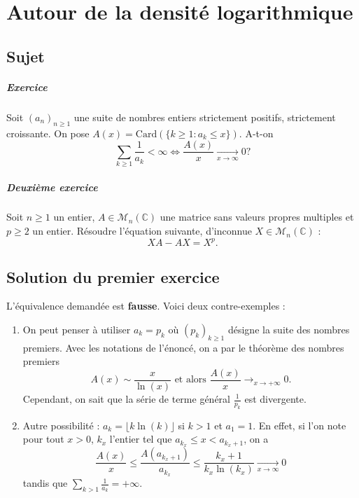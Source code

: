 \chapter{Autour de la densité logarithmique}

\section{Sujet}

\paragraph{Exercice}
Soit $(a_n)_{n\geqslant1}$ une suite de nombres entiers strictement positifs, strictement croissante. On pose $A(x) = \mathrm{Card}(\{k \geqslant 1 : a_{k} \leqslant  x\})$. A-t-on \[\sum _{k\geqslant1} \frac{1}{a_{k}} <\infty  \iff  \frac{A(x)}{x} \xrightarrow[x\rightarrow \infty ]{} 0 ?\]

\paragraph{Deuxième exercice}

Soit $n\geqslant 1$ un entier, $A \in \mathscr M_n(\mathbb C)$ une matrice sans valeurs propres multiples et $p \geqslant 2$ un entier. Résoudre l'équation suivante, d'inconnue $X \in \mathscr M_n(\mathbb C)$ :
\[
    XA - AX = X^p.
\]

\section{Solution du premier exercice}

L'équivalence demandée est \textbf{fausse}. Voici deux contre-exemples :
\begin{enumerate}
    \item On peut penser à utiliser $a_{k}=p_{k}$ où $\displaystyle (p_{k})_{k\geq 1}$ désigne la suite des nombres premiers. Avec les notations de l'énoncé, on a par le théorème des nombres premiers $$A(x)\sim \frac{x}{\ln(x)} \mbox{ et alors } \frac{A(x)}{x}\longrightarrow_{x\rightarrow +\infty} 0.$$
    Cependant, on sait que la série de terme général $\displaystyle \frac{1}{p_{k}}$ est divergente.
    \item Autre possibilité : $a_k = \lfloor k \ln(k)\rfloor$ si $k>1$ et $a_1=1$. En effet, si l'on note pour tout $x>0$, $k_x$ l'entier tel que $a_{k_x}\leqslant x <a_{k_x+1}$, on a \[\frac{A(x)}{x} \leqslant \frac{A(a_{k_x+1})}{a_{k_x}} \leqslant \frac{k_x+1}{k_x\ln(k_x)} \xrightarrow[x\rightarrow \infty ]{} 0\]
    tandis que $\displaystyle \sum_{k>1} \frac1{a_k} =+\infty$.
\end{enumerate}

